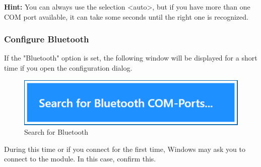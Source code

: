 \documentclass[11pt,a4paper]{article}
\begin{document}
\textbf{Hint:} You can always use the selection <auto>, but if you have more than one COM port available, it can take some seconds until the right one is recognized.


\subsubsection{Configure Bluetooth} \label{CertaboBluetooth}

If the "Bluetooth" option is set, the following window will be displayed for a short time if you open the configuration dialog.

\begin{figure}[H]
	\centering
	\includegraphics[scale=0.8]{MillenniumChessLink10.png}
	\caption{Search for Bluetooth}
	\label{fig:CertaboBT10}
\end{figure}

During this time or if you connect for the first time, Windows may ask you to connect to the module. In this case, confirm this. 
\end{document}
